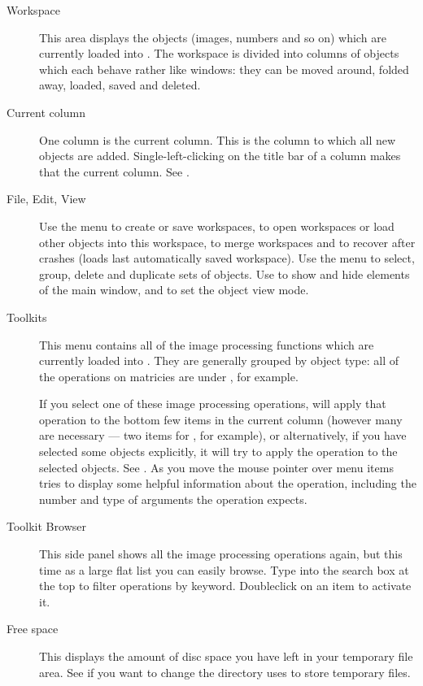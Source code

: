 \begin{description}

\item[Workspace]
This area displays the objects (images, numbers and so on) which
are currently loaded into \nip{}. The workspace is divided into columns of
objects which each behave rather like windows: they can be moved around,
folded away, loaded, saved and deleted. 

\item[Current column]
One column is the current column. This is the column to
which all new objects are added. Single-left-clicking on the title bar of
a column makes that the current column. See .

\item[File, Edit, View]
Use the  menu to create or save work\-spaces, to open workspaces or
load other objects into this workspace, to merge workspaces and to recover
after crashes (loads last automatically saved workspace).
Use the  menu to select, group, delete and duplicate sets of objects.
Use  to show and hide elements of the main window, and to set the
object view mode. 

\item[Toolkits]
This menu contains all of the image processing functions which are currently
loaded into \nip{}. They are generally grouped by object type: all of the
operations on matricies are under , for example.

If you select one of these image processing operations, \nip{} will apply
that operation to the bottom few items in the current column (however many are
necessary --- two items for , for example),
or alternatively, if you have selected some objects explicitly, it will try
to apply the operation to the selected objects. See . As
you move the mouse pointer over menu items \nip{} tries to display some
helpful information about the operation, including the number and type of
arguments the operation expects.

\item[Toolkit Browser]
This side panel shows all the image processing operations again, but this time
as a large flat list you can easily browse. Type into the search box at the
top to filter operations by keyword. Doubleclick on an item to activate it.

\item[Free space]
This displays the amount of disc space you have left in your temporary
file area. See  if you want to change the directory \nip{}
uses to store temporary files.


\end{description}
